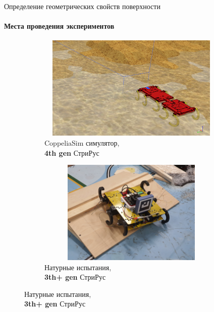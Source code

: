 \documentclass[aspectratio=169,xcolor=table,10pt]{beamer}
\begin{document}
\begin{frame}[t]{Определение геометрических свойств поверхности}
    \framesubtitle{Места проведения экспериментов}
    \vspace{-15pt}
    \begin{figure}[H]
        \begin{subfigure}[t]{0.49\textwidth}
            \centering\includegraphics[height=5cm,width=1\textwidth,keepaspectratio]{coppelia_sim.png}
            \caption*{CoppeliaSim симулятор,\\ \textbf{4th gen} СтриРус}
        \end{subfigure}
        \begin{subfigure}[t]{0.49\textwidth}
            \centering\includegraphics[height=5cm,width=1\textwidth,keepaspectratio]{rl_sim.JPG}
            \caption*{Натурные испытания,\\ \textbf{3th+ gen} СтриРус}
        \end{subfigure}
    \end{figure}
\end{frame}
\end{document}
